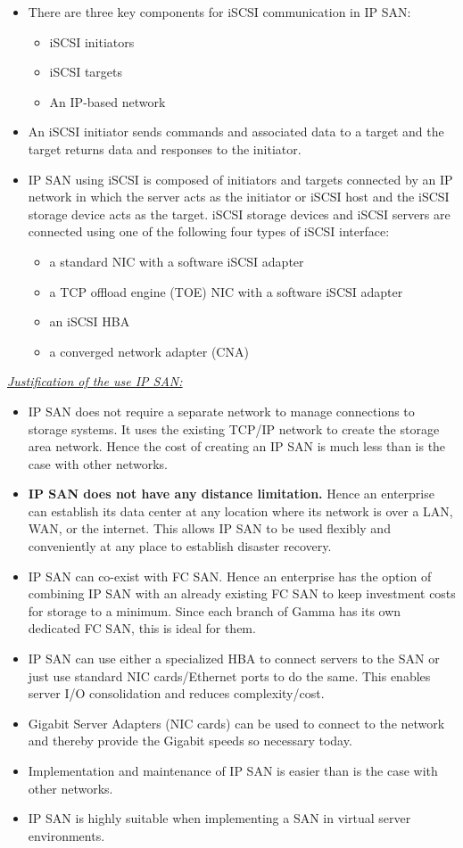 \documentclass[a4paper, 12pt]{article}
\begin{document}
\begin{itemize}
\item
There are three key components for iSCSI communication in IP SAN:
\begin{itemize}
\item
iSCSI initiators
\item
iSCSI targets
\item
An IP-based network
\end{itemize}
\item
An iSCSI initiator sends commands and associated data to a target and the target returns data and responses to the initiator.
\item
IP SAN using iSCSI is composed of initiators and targets connected by an IP network in which the server acts as the initiator or iSCSI host and the iSCSI storage device acts as the target. iSCSI storage devices and iSCSI servers are connected using one of the following four types of iSCSI interface:
\begin{itemize}
\item
a standard NIC with a software iSCSI adapter
\item
a TCP offload engine (TOE) NIC with a software iSCSI adapter
\item
an iSCSI HBA
\item
a converged network adapter (CNA)
\end{itemize}
\end{itemize}


\textit{\underline{Justification of the use IP SAN:}}
\begin{itemize}
\item
IP SAN does not require a separate network to manage connections to storage systems. It uses the existing TCP/IP network to create the storage area network. Hence the cost of creating an IP SAN is much less than is the case with other networks.\item
\textbf{IP SAN does not have any distance limitation.} Hence an enterprise can establish its data center at any location where its network is over a LAN, WAN, or the internet. This allows IP SAN to be used flexibly and conveniently at any place to establish disaster recovery.
\item
IP SAN can co-exist with FC SAN. Hence an enterprise has the option of combining IP SAN with an already existing FC SAN to keep investment costs for storage to a minimum. Since each branch of Gamma has its own dedicated FC SAN, this is ideal for them.
\item
IP SAN can use either a specialized HBA to connect servers to the SAN or just use standard NIC cards/Ethernet ports to do the same. This enables server I/O consolidation and reduces complexity/cost.
\item
Gigabit Server Adapters (NIC cards) can be used to connect to the network and thereby provide the Gigabit speeds so necessary today.
\item
Implementation and maintenance of IP SAN is easier than is the case with other networks.
\item
IP SAN is highly suitable when implementing a SAN in virtual server environments.
\end{itemize}
\end{document}
